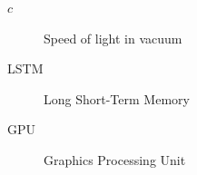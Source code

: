 \begin{description}
  \item[$c$] Speed of light in vacuum
  \item[LSTM] Long Short-Term Memory
  \item[GPU] Graphics Processing Unit
\end{description}
